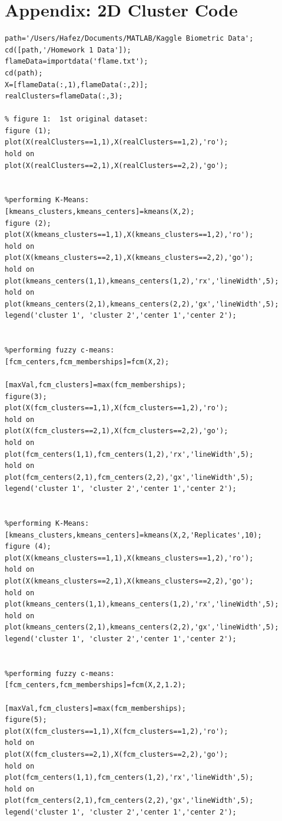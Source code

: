 \documentclass{article}
\begin{document}
\section*{Appendix: 2D Cluster Code}
\begin{lstlisting}
path='/Users/Hafez/Documents/MATLAB/Kaggle Biometric Data';
cd([path,'/Homework 1 Data']);
flameData=importdata('flame.txt');
cd(path);
X=[flameData(:,1),flameData(:,2)];
realClusters=flameData(:,3);

% figure 1:  1st original dataset:
figure (1);
plot(X(realClusters==1,1),X(realClusters==1,2),'ro');
hold on
plot(X(realClusters==2,1),X(realClusters==2,2),'go');


%performing K-Means:
[kmeans_clusters,kmeans_centers]=kmeans(X,2);
figure (2);
plot(X(kmeans_clusters==1,1),X(kmeans_clusters==1,2),'ro');
hold on
plot(X(kmeans_clusters==2,1),X(kmeans_clusters==2,2),'go');
hold on
plot(kmeans_centers(1,1),kmeans_centers(1,2),'rx','lineWidth',5);
hold on
plot(kmeans_centers(2,1),kmeans_centers(2,2),'gx','lineWidth',5);
legend('cluster 1', 'cluster 2','center 1','center 2');


%performing fuzzy c-means:
[fcm_centers,fcm_memberships]=fcm(X,2);

[maxVal,fcm_clusters]=max(fcm_memberships);
figure(3);
plot(X(fcm_clusters==1,1),X(fcm_clusters==1,2),'ro');
hold on
plot(X(fcm_clusters==2,1),X(fcm_clusters==2,2),'go');
hold on
plot(fcm_centers(1,1),fcm_centers(1,2),'rx','lineWidth',5);
hold on
plot(fcm_centers(2,1),fcm_centers(2,2),'gx','lineWidth',5);
legend('cluster 1', 'cluster 2','center 1','center 2');


%performing K-Means:
[kmeans_clusters,kmeans_centers]=kmeans(X,2,'Replicates',10);
figure (4);
plot(X(kmeans_clusters==1,1),X(kmeans_clusters==1,2),'ro');
hold on
plot(X(kmeans_clusters==2,1),X(kmeans_clusters==2,2),'go');
hold on
plot(kmeans_centers(1,1),kmeans_centers(1,2),'rx','lineWidth',5);
hold on
plot(kmeans_centers(2,1),kmeans_centers(2,2),'gx','lineWidth',5);
legend('cluster 1', 'cluster 2','center 1','center 2');


%performing fuzzy c-means:
[fcm_centers,fcm_memberships]=fcm(X,2,1.2);

[maxVal,fcm_clusters]=max(fcm_memberships);
figure(5);
plot(X(fcm_clusters==1,1),X(fcm_clusters==1,2),'ro');
hold on
plot(X(fcm_clusters==2,1),X(fcm_clusters==2,2),'go');
hold on
plot(fcm_centers(1,1),fcm_centers(1,2),'rx','lineWidth',5);
hold on
plot(fcm_centers(2,1),fcm_centers(2,2),'gx','lineWidth',5);
legend('cluster 1', 'cluster 2','center 1','center 2');
\end{lstlisting}
\end{document}
